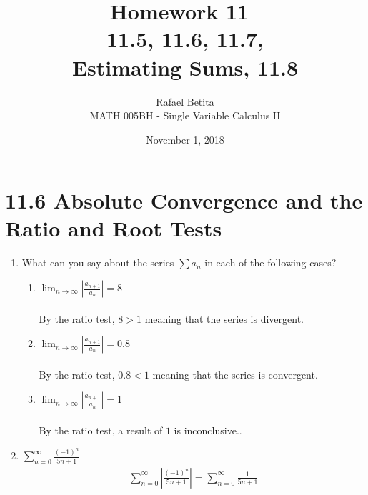 \documentclass[12pt]{article}
\title{Homework 11\
\\11.5, 11.6, 11.7, \\Estimating Sums, 11.8}
\author{Rafael Betita\\
MATH 005BH - Single Variable Calculus II}
\date{November 1, 2018}
\begin{document}
\maketitle

\newpage\section{11.6 Absolute Convergence and the Ratio and Root Tests}
\begin{enumerate}
    \item What can you say about the series $\sum a_n$ in each of the following cases?
    \begin{enumerate}
        \item $\lim_{n\to\infty} \left|\frac{a_{n+1}}{a_n}\right| = 8$
        \\\\ By the ratio test, $8 > 1$ meaning that the series is divergent. 
        \item $\lim_{n\to\infty} \left|\frac{a_{n+1}}{a_n}\right| = 0.8$
        \\\\ By the ratio test, $0.8 < 1$ meaning that the series is convergent.
        \item $\lim_{n\to\infty} \left|\frac{a_{n+1}}{a_n}\right| = 1$
        \\\\ By the ratio test, a result of $1$ is inconclusive..
    \end{enumerate}
    \addtocounter{enumi}{1}\item $\sum^\infty_{n=0}\frac{(-1)^n}{5n+1}$
    \begin{gather*}
        \sum^\infty_{n=0}\left|\frac{(-1)^n}{5n+1}\right|=\sum^\infty_{n=0}\frac{1}{5n+1}
        

\end{gather*}
\end{enumerate}
\end{document}
